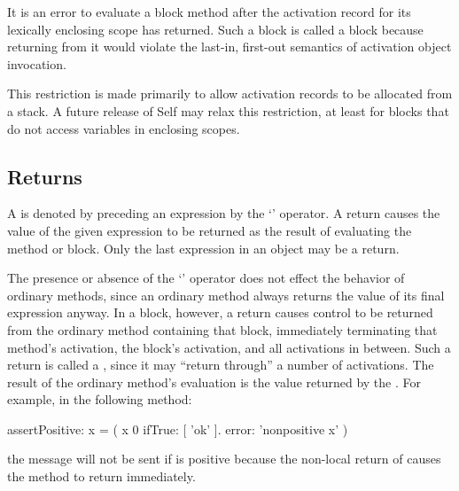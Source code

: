 \documentclass[letterpaper,10pt,english]{sphinxmanual}
\begin{document}
It is an error to evaluate a block method after the activation record for its lexically enclosing scope
has returned. Such a block is called a  block because returning from it would violate the
last-in, first-out semantics of activation object invocation.

This restriction is made primarily to allow activation records to be allocated from a stack. A future
release of Self may relax this restriction, at least for blocks that do not access variables in
enclosing scopes.


\subsection{Returns}
\label{\detokenize{langref:index-27}}\label{\detokenize{langref:returns}}\label{\detokenize{langref:pp-langref-returns}}
A  is denoted by preceding an expression by the ‘\sphinxcode{\textasciicircum{}}’ operator. A return causes the value of the given expression to be returned as the result of evaluating the method or block. Only the last ex­pression in an object may be a return.

The presence or absence of the ‘\sphinxcode{\textasciicircum{}}’ operator does not effect the behavior of ordinary methods, since an ordinary method always returns the value of its final expression anyway. In a block, however, a return causes control to be returned from the ordinary method containing that block, immediately terminating that method’s activation, the block’s activation, and all activations in between. Such a return is called a , since it may “return through” a number of activations. The result of the ordinary method’s evaluation is the value returned by the . For example, in the following method:

\begin{sphinxVerbatim}[commandchars=\\\{\}]
assertPositive: x = (
                x \PYGZgt{} 0 ifTrue: [ \PYGZca{} ’ok’ ].
                error: ’non\PYGZhy{}positive x’ )
\end{sphinxVerbatim}

the  message will not be sent if  is positive because the non-local return of  causes the  method to return immediately.
\end{document}
